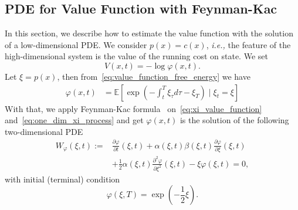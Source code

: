 \documentclass[letterpaper]{article} %
\newcommand{\ie}{\textit{i.e., }}
\newtheorem{remark}[theorem]{Remark}
\begin{document}
\subsection{PDE for Value Function with Feynman-Kac}
\label{sec:Feynman_Kac_PDE}
In this section, we describe how to estimate the value function with the solution of a low-dimensional PDE.
We consider $p(x) = c(x)$, \ie the feature of the high-dimensional system is the value of the running cost on state.
We set
\begin{equation}
\label{eq:V_exp_transformation}
    V(x, t)=-\log \varphi(x, t).
\end{equation}
Let $\xi = p(x)$, then from~\eqref{eq:value_function_free_energy} we have
\begin{equation}
\label{eq:xi_value_function}
\begin{aligned}
    \varphi(x, t) %
    & = \mathbb{E} \left[\exp \left(-\int_t^T \xi_\tau d \tau - \xi_T\right)  \mid \xi_t=\xi\right] 
\end{aligned}
\end{equation}
With that, we apply Feynman-Kac formula~\cite{del2004feynman} on~\eqref{eq:xi_value_function} and~\eqref{eq:one_dim_xi_process} and get $\varphi(x, t)$ is the solution of the following two-dimensional PDE
\begin{equation}
\label{eq:one_dim_PDE}
\begin{aligned}
    W_{\varphi}(\xi,t) := & \frac{\partial \varphi}{\partial t}(\xi, t) + \alpha(\xi, t)\beta(\xi, t)\frac{\partial \varphi}{\partial \xi}(\xi, t) \\
    & +\frac{1}{2} \alpha(\xi, t) \frac{\partial^2 \varphi}{\partial \xi^2}(\xi, t) - \xi \varphi(\xi, t)=0,
\end{aligned}
\end{equation}
with initial (terminal) condition
\begin{equation}
\label{eq:one_dim_PDE_ic}
    \varphi(\xi, T) = \exp(-\frac{1}{2}\xi).
\end{equation}
\end{document}
